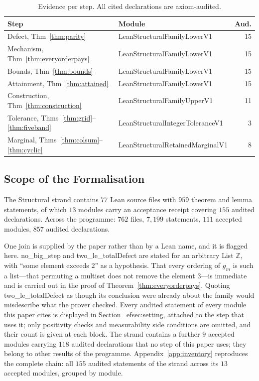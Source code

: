 \documentclass[conference]{IEEEtran}
\theoremstyle{definition}
\newcommand{\lean}[1]{\textsf{\footnotesize #1}}
\begin{document}
\begin{table}[htbp]
\caption{Evidence per step. All cited declarations are axiom-audited.}
\label{tab:inventory}
\centering\footnotesize\setlength{\tabcolsep}{3pt}
\begin{tabular}{@{}llr@{}}
\toprule
Step & Module & Aud. \\
\midrule
Defect, Thm~\ref{thm:parity}            & \lean{LeanStructuralFamilyLowerV1}      & 15 \\
Mechanism, Thm~\ref{thm:everyorderpays} & \lean{LeanStructuralFamilyLowerV1}      & 15 \\
Bounds, Thm~\ref{thm:bounds}            & \lean{LeanStructuralFamilyLowerV1}      & 15 \\
Attainment, Thm~\ref{thm:attained}      & \lean{LeanStructuralFamilyLowerV1}      & 15 \\
Construction, Thm~\ref{thm:construction}& \lean{LeanStructuralFamilyUpperV1}      & 11 \\
Tolerance, Thms~\ref{thm:grid}--\ref{thm:fiveband} & \lean{LeanStructuralIntegerToleranceV1} & 3 \\
Marginal, Thms~\ref{thm:colsum}--\ref{thm:cyclic} & \lean{LeanStructuralRetainedMarginalV1} & 8 \\
\bottomrule
\end{tabular}
\end{table}

\subsection{Scope of the Formalisation}

The Structural strand contains $77$ Lean source files with $959$ theorem and lemma
statements, of which $13$ modules carry an acceptance receipt covering $155$ audited
declarations. Across the programme: $762$ files, $7{,}199$ statements, $111$ accepted modules,
$857$ audited declarations.

One join is supplied by the paper rather than by a Lean name, and it is flagged here.
\lean{no\_big\_step} and \lean{two\_le\_totalDefect} are stated for an arbitrary
\lean{List $\mathbb{Z}$}, with ``some element exceeds $2$'' as a hypothesis. That every
ordering of $g_{m}$ is such a list---that permuting a multiset does not remove the element
$3$---is immediate and is carried out in the proof of Theorem~\ref{thm:everyorderpays}.
Quoting \lean{two\_le\_totalDefect} as though its conclusion were already about the family
would misdescribe what the prover checked. Every audited statement of every module this paper cites is displayed in Section~
ef{sec:setting}, attached to the step that uses it; only positivity checks and measurability side conditions are omitted, and their count is given at each block. The strand contains a further $9$ accepted modules carrying $118$ audited declarations that no step of this paper uses; they belong to other results of the programme. Appendix~\ref{app:inventory} reproduces the complete chain: all $155$ audited statements of the strand across its $13$ accepted modules, grouped by module.
\end{document}
